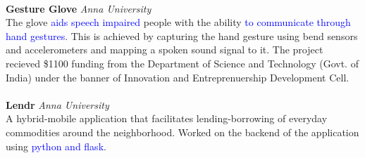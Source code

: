 \documentclass{resume}
\begin{document}
\\
\textbf{Gesture Glove} \hfill \textit{Anna University} \\
The glove \textcolor{blue}{aids speech impaired} people with the ability \textcolor{blue}{to communicate through hand gestures}. This is achieved by capturing the hand gesture using bend sensors and accelerometers and mapping a spoken sound signal to it. The project recieved \$1100 funding from the Department of Science and Technology (Govt. of India) under the banner of Innovation and Entreprenuership Development Cell.\\
\\
\textbf{Lendr} \hfill \textit{Anna University} \\
A hybrid-mobile application that facilitates lending-borrowing of everyday commodities around the neighborhood. Worked on the backend of the application using \textcolor{blue}{python and flask}. 
\end{document}
